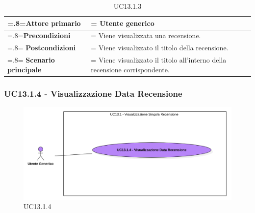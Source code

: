             \begin{table}[H]
                \centering
                \renewcommand{\arraystretch}{1.8}
                \renewcommand\tabularxcolumn[1]{m{#1}}
                \begin{tabularx}{0.9\textwidth} {
                    >{\hsize=.8\hsize\linewidth=\hsize}X
                    >{\hsize=1.2\hsize\linewidth=\hsize}X}
                    \hline
                    \textbf{Attore primario} & Utente generico \\
                    \hline
                    \textbf{Precondizioni} & Viene visualizzata una recensione. \\
                    \hline
                    \textbf{Postcondizioni} & Viene visualizzato il titolo della recensione. \\
                    \hline
                    \textbf{Scenario principale} & Viene visualizzato il titolo all'interno della recensione corrispondente. \\
                    \hline
                \end{tabularx}
                \caption{UC13.1.3}
            \end{table}

        \subsubsection{UC13.1.4 - Visualizzazione Data Recensione}
        \label{UC13.1.4}

            \begin{figure}[H]
                \centering
                \includegraphics[scale=0.6]{src/img/UC13.1.4.png}
                \caption{UC13.1.4}
            \end{figure}

